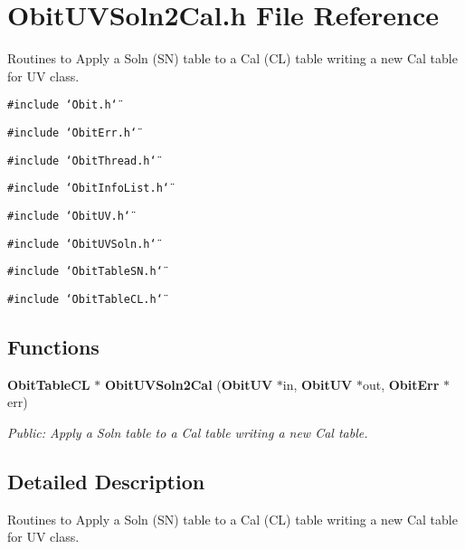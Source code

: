 \section{Obit\-UVSoln2Cal.h File Reference}
\label{ObitUVSoln2Cal_8h}
Routines to Apply a Soln (SN) table to a Cal (CL) table writing a new Cal table for UV class. 

{\tt \#include \char`\"{}Obit.h\char`\"{}}\par
{\tt \#include \char`\"{}Obit\-Err.h\char`\"{}}\par
{\tt \#include \char`\"{}Obit\-Thread.h\char`\"{}}\par
{\tt \#include \char`\"{}Obit\-Info\-List.h\char`\"{}}\par
{\tt \#include \char`\"{}Obit\-UV.h\char`\"{}}\par
{\tt \#include \char`\"{}Obit\-UVSoln.h\char`\"{}}\par
{\tt \#include \char`\"{}Obit\-Table\-SN.h\char`\"{}}\par
{\tt \#include \char`\"{}Obit\-Table\-CL.h\char`\"{}}\par
\subsection*{Functions}
\begin{CompactItemize}
\item 
{\bf Obit\-Table\-CL} $\ast$ {\bf Obit\-UVSoln2Cal} ({\bf Obit\-UV} $\ast$in, {\bf Obit\-UV} $\ast$out, {\bf Obit\-Err} $\ast$err)
\begin{CompactList}\small\item\em Public: Apply a Soln table to a Cal table writing a new Cal table. \item\end{CompactList}\end{CompactItemize}


\subsection{Detailed Description}
Routines to Apply a Soln (SN) table to a Cal (CL) table writing a new Cal table for UV class. 

